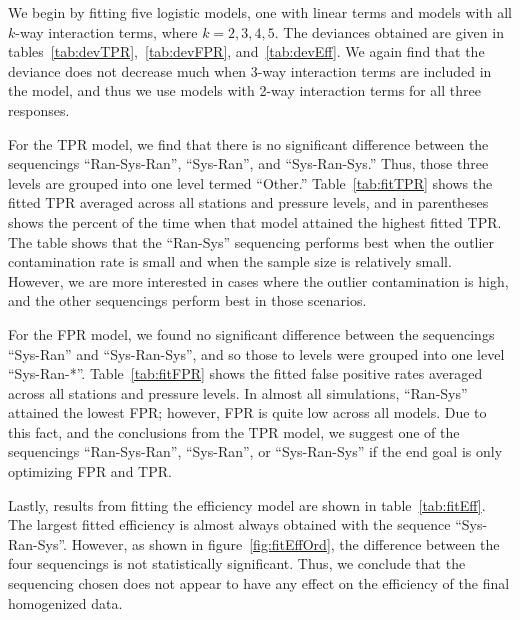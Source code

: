 \documentclass[12pt]{article}
\begin{document}
\begin{doublespacing}
We begin by fitting five logistic models, one with linear terms and models with all $k$-way interaction terms, where $k=2,3,4,5$.  The deviances obtained are given in tables~\ref{tab:devTPR},~\ref{tab:devFPR}, and~\ref{tab:devEff}.  We again find that the deviance does not decrease much when 3-way interaction terms are included in the model, and thus we use models with 2-way interaction terms for all three responses.

For the TPR model, we find that there is no significant difference between the sequencings ``Ran-Sys-Ran'', ``Sys-Ran'', and ``Sys-Ran-Sys.''  Thus, those three levels are grouped into one level termed ``Other.''  Table~\ref{tab:fitTPR} shows the fitted TPR averaged across all stations and pressure levels, and in parentheses shows the percent of the time when that model attained the highest fitted TPR.  The table shows that the ``Ran-Sys'' sequencing performs best when the outlier contamination rate is small and when the sample size is relatively small.  However, we are more interested in cases where the outlier contamination is high, and the other sequencings perform best in those scenarios.

For the FPR model, we found no significant difference between the sequencings ``Sys-Ran'' and ``Sys-Ran-Sys'', and so those to levels were grouped into one level ``Sys-Ran-*''.  Table~\ref{tab:fitFPR} shows the fitted false positive rates averaged across all stations and pressure levels.  In almost all simulations, ``Ran-Sys'' attained the lowest FPR; however, FPR is quite low across all models.  Due to this fact, and the conclusions from the TPR model, we suggest one of the sequencings ``Ran-Sys-Ran'', ``Sys-Ran'', or ``Sys-Ran-Sys'' if the end goal is only optimizing FPR and TPR.

Lastly, results from fitting the efficiency model are shown in table~\ref{tab:fitEff}.  The largest fitted efficiency is almost always obtained with the sequence ``Sys-Ran-Sys''.  However, as shown in figure~\ref{fig:fitEffOrd}, the difference between the four sequencings is not statistically significant.  Thus, we conclude that the sequencing chosen does not appear to have any effect on the efficiency of the final homogenized data.



\end{doublespacing}
\end{document}
